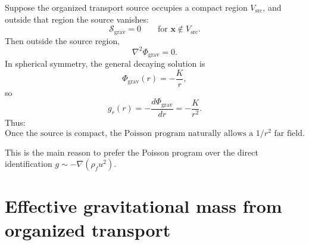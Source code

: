 \documentclass[11pt]{article}
\newcommand{\rhoF}{\rho_{\!f}}
\newcommand{\src}{\mathrm{src}}
\newcommand{\grav}{\mathrm{grav}}
\begin{document}
        Suppose the organized transport source occupies a compact region \(V_{\src}\), and outside that region the source vanishes:
        \begin{equation}
            \mathcal{S}_{\grav}=0
            \qquad
            \text{for } \mathbf{x}\notin V_{\src}.
            \label{eq:vacuum-source}
        \end{equation}
        Then outside the source region,
        \begin{equation}
            \nabla^2 \Phi_{\grav}=0.
            \label{eq:laplace-vacuum}
        \end{equation}
        In spherical symmetry, the general decaying solution is
        \begin{equation}
            \Phi_{\grav}(r) = -\frac{K}{r},
            \label{eq:phi-vac}
        \end{equation}
        so
        \begin{equation}
            g_r(r) = -\frac{d\Phi_{\grav}}{dr} = -\frac{K}{r^2}.
            \label{eq:g-vac}
        \end{equation}
        Thus:
        \begin{equation}
            \boxed{
                \text{Once the source is compact, the Poisson program naturally allows a }1/r^2\text{ far field.}
            }
            \label{eq:newton-recovery}
        \end{equation}
        
        This is the main reason to prefer the Poisson program over the direct identification \(g\sim -\nabla(\rhoF u^2)\).
        
        \section{Effective gravitational mass from organized transport}
        
\end{document}
